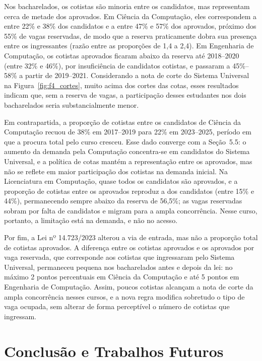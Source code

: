 \documentclass[12pt]{article}
\begin{document}
Nos bacharelados, os cotistas são minoria entre os candidatos, mas representam cerca de metade dos aprovados. Em Ciência da Computação, eles correspondem a entre 22\% e 38\% dos candidatos e a entre 47\% e 57\% dos aprovados, próximo dos 55\% de vagas reservadas, de modo que a reserva praticamente dobra sua presença entre os ingressantes (razão entre as proporções de 1,4 a 2,4). Em Engenharia de Computação, os cotistas aprovados ficaram abaixo da reserva até 2018--2020 (entre 32\% e 46\%), por insuficiência de candidatos cotistas, e passaram a 45\%--58\% a partir de 2019--2021. Considerando a nota de corte do Sistema Universal na Figura~\ref{fig:f4_cortes}, muito acima dos cortes das cotas, esses resultados indicam que, sem a reserva de vagas, a participação desses estudantes nos dois bacharelados seria substancialmente menor.

Em contrapartida, a proporção de cotistas entre os candidatos de Ciência da Computação recuou de 38\% em 2017--2019 para 22\% em 2023--2025, período em que a procura total pelo curso cresceu. Esse dado converge com a Seção~5.5: o aumento da demanda pela Computação concentra-se em candidatos do Sistema Universal, e a política de cotas mantém a representação entre os aprovados, mas não se reflete em maior participação dos cotistas na demanda inicial. Na Licenciatura em Computação, quase todos os candidatos são aprovados, e a proporção de cotistas entre os aprovados reproduz a dos candidatos (entre 15\% e 44\%), permanecendo sempre abaixo da reserva de 56,5\%; as vagas reservadas sobram por falta de candidatos e migram para a ampla concorrência. Nesse curso, portanto, a limitação está na demanda, e não no acesso.

Por fim, a Lei nº 14.723/2023 alterou a via de entrada, mas não a proporção total de cotistas aprovados. A diferença entre os cotistas aprovados e os aprovados por vaga reservada, que corresponde aos cotistas que ingressaram pelo Sistema Universal, permaneceu pequena nos bacharelados antes e depois da lei: no máximo 2 pontos percentuais em Ciência da Computação e até 5 pontos em Engenharia de Computação. Assim, poucos cotistas alcançam a nota de corte da ampla concorrência nesses cursos, e a nova regra modifica sobretudo o tipo de vaga ocupada, sem alterar de forma perceptível o número de cotistas que ingressam.

\section{Conclusão e Trabalhos Futuros}
\end{document}
